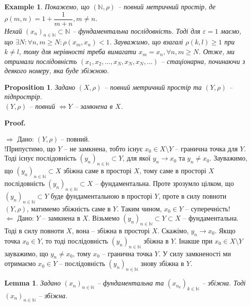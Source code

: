 \documentclass[a4paper, 10pt]{article}
\makeatletter
\def\rightproof{$\boxed{\Rightarrow}$ }
\def\leftproof{$\boxed{\Leftarrow}$ }
\theoremstyle{theoremdd}
\theoremstyle{theoremdd}
\theoremstyle{theoremdd}
\theoremstyle{theoremdd}
\newtheorem{example}[theorem]{Example}
\theoremstyle{theoremdd}
\newtheorem{proposition}[theorem]{Proposition}
\theoremstyle{theoremdd}
\theoremstyle{theoremdd}
\newtheorem{lemma}[theorem]{Lemma}
\theoremstyle{theoremdd}
\renewenvironment{proof}[1][Proof.\\]{\par
\pushQED{\hfill \qed}%
\normalfont \topsep6\p@\@plus6\p@\relax
\trivlist
\item\relax
{\bfseries
#1\@addpunct{.}}\hspace\labelsep\ignorespaces
}{%
\popQED\endtrivlist\@endpefalse
}
\makeatother
\begin{document}
\begin{example}
Покажемо, що $(\mathbb{N},\rho)$ -- повний метричний простір, де $\rho(m,n) = 1 + \dfrac{1}{m+n}, m \neq n$.\\
Нехай $(x_n)_{n \in \mathbb{N}} \subset \mathbb{N}$ -- фундаментальна послідовність. Тоді для $\varepsilon = 1$ маємо, що $\exists N: \forall n,m \geq N: \rho(x_m,x_n) < 1$. Зауважимо, що взагалі $\rho(k,l) \geq 1$ при $k \neq l$, тому для нерівності треба вимагати $x_m = x_n, \forall n,m \geq N$. Отже, ми отримали послідовність $(x_1,x_2,\dots,x_N,x_N,x_N,\dots)$ -- стаціонарна, починаючи з деякого номеру, яка буде збіжною.
\end{example}

\begin{proposition}
Задано $(X,\rho)$ -- повний метричний простір та $(Y,\rho)$ -- підпрострір.\\
$(Y,\rho)$ -- повний $\iff Y$ -- замкнена в $X$.
\end{proposition}

\begin{proof}
\rightproof Дано: $(Y,\rho)$ -- повний.\\
!Припустимо, що $Y$ -- не замкнена, тобто існує $x_0 \in X \setminus Y$ -- гранична точка для $Y$. Тоді існує послідовність $(y_n)_{n \in \mathbb{N}} \subset Y$, для якої $y_n \to x_0$ та $y_n \neq x_0$. Зауважимо, що $(y_n)_{n \in \mathbb{N}} \subset X$ збіжна саме в просторі $X$, тому саме в просторі $X$ послідовність $(y_n)_{n \in \mathbb{N}} \subset X$ -- фундаментальна. Проте зрозумло цілком, що $(y_n)_{n \in \mathbb{N}} \subset Y$ буде фундаментальною в просторі $Y$, проте в силу повноти $(Y,\rho)$, матимемо збіжність саме в $Y$. Таким чином, $x_0 \in Y$ -- суперечність!
\bigskip \\
\leftproof Дано: $Y$ -- замкнена в $X$. Візьмемо $(y_n)_{n \in \mathbb{N}} \subset Y \subset X$ -- фундаментальна. Тоді в силу повноти $X$, вона -- збіжна в просторі $X$. Скажімо, $y_n \to x_0$. Якщо точка $x_0 \in Y$, то тоді послідовність $(y_n)_{n \in \mathbb{N}}$ збіжна в $Y$. Інакше при $x_0 \in X \setminus Y$ зауважимо, що $y_n \neq x_0$, тому $x_0$ -- гранична точка $Y$. У силу замкненості ми отримаємо $x_0 \in Y$ -- послідовність $(y_n)_{n \in \mathbb{N}}$ знову збіжна в $Y$.
\end{proof}

\begin{lemma}
\label{Cauchy_and_convergent_subsequence_implies_convergent_sequence}
Задано $(x_n)_{n \in \mathbb{N}}$ -- фундаментальна та $\left(x_{n_k}\right)_{k \in \mathbb{N}}$ -- збіжна. Тоді $(x_n)_{n \in \mathbb{N}}$ -- збіжна.
\end{lemma}
\end{document}

